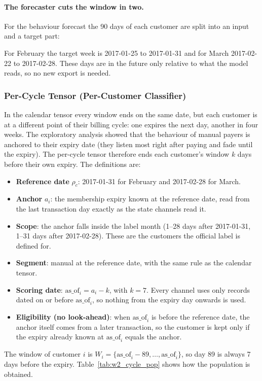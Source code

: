 \documentclass{article}
\begin{document}
\paragraph{The forecaster cuts the window in two.} For the behaviour forecast the 90 days of each customer are split into an input and a target part:
\begin{center}
\end{center}
For February the target week is 2017-01-25 to 2017-01-31 and for March 2017-02-22 to 2017-02-28. These days are in the future only relative to what the model reads, so no new export is needed.

\subsubsection{Per-Cycle Tensor (Per-Customer Classifier)}

In the calendar tensor every window ends on the same date, but each customer is at a different point of their billing cycle: one expires the next day, another in four weeks. The exploratory analysis showed that the behaviour of manual payers is anchored to their expiry date (they listen most right after paying and fade until the expiry). The per-cycle tensor therefore ends each customer's window $k$ days before their own expiry. The definitions are:
\begin{itemize}
    \item \textbf{Reference date} $\rho_c$: 2017-01-31 for February and 2017-02-28 for March.
    \item \textbf{Anchor} $a_i$: the membership expiry known at the reference date, read from the last transaction day exactly as the state channels read it.
    \item \textbf{Scope}: the anchor falls inside the label month (1--28 days after 2017-01-31, 1--31 days after 2017-02-28). These are the customers the official label is defined for.
    \item \textbf{Segment}: manual at the reference date, with the same rule as the calendar tensor.
    \item \textbf{Scoring date}: $\text{as\_of}_i = a_i - k$, with $k = 7$. Every channel uses only records dated on or before $\text{as\_of}_i$, so nothing from the expiry day onwards is used.
    \item \textbf{Eligibility (no look-ahead)}: when $\text{as\_of}_i$ is before the reference date, the anchor itself comes from a later transaction, so the customer is kept only if the expiry already known at $\text{as\_of}_i$ equals the anchor.
\end{itemize}
The window of customer $i$ is $W_i = \{\text{as\_of}_i - 89, \dots, \text{as\_of}_i\}$, so day 89 is always 7 days before the expiry. Table~\ref{tab:w2_cycle_pop} shows how the population is obtained.
\end{document}
